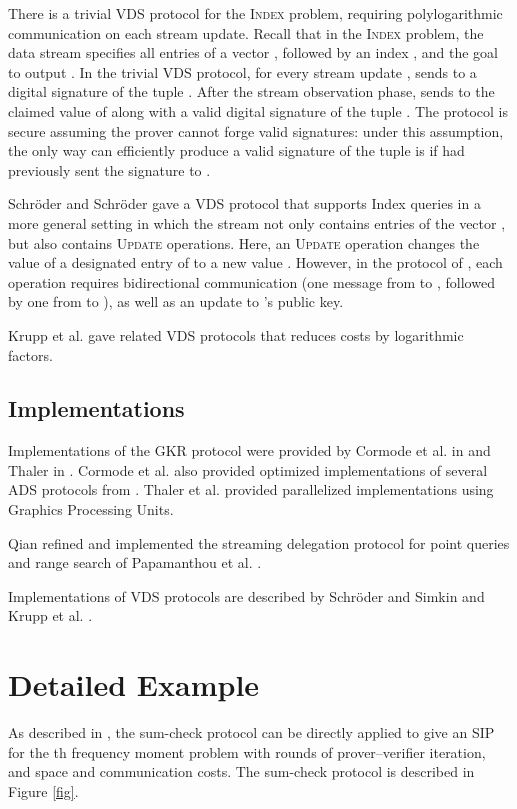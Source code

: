 \documentclass[11pt, letterpaper]{article}
\begin{document}
There is a trivial VDS protocol for the \textsc{Index} problem, requiring polylogarithmic communication on each stream update. Recall that in the \textsc{Index} problem, the data stream specifies all entries of a vector , followed by an index , and the goal to output . In the trivial VDS protocol, for every stream update ,  sends to  a digital signature of the tuple . After the stream observation phase,  sends to  the claimed value of  along with a valid digital signature of the tuple . The protocol is secure assuming the prover cannot forge valid signatures: under this assumption, the only way  can efficiently produce a valid signature of the tuple  is if  had previously sent the signature to .

Schr{\"o}der and Schr{\"o}der \cite{ccs} gave a VDS protocol that supports {\sc Index} queries in a more general setting in which the stream not only contains entries of the vector , but also contains \textsc{Update} operations. Here, an \textsc{Update} operation changes the value of a designated entry  of  to a new value . However, in the protocol of \cite{ccs}, each  operation requires bidirectional communication (one message from  to , followed by one from  to ), as well as an update to 's public key. 

Krupp et al. \cite{krupp} gave related VDS protocols that reduces costs by logarithmic factors.


\subsection{Implementations}
Implementations of the GKR protocol were provided by Cormode et al. in \cite{itcs} and Thaler in \cite{crypto}. Cormode et al. \cite{itcs} also provided 
optimized implementations of several ADS protocols from \cite{icalp, esa}. Thaler et al. \cite{hotcloud} provided parallelized implementations using Graphics Processing Units. 

Qian \cite{sadimp} refined and implemented the streaming delegation protocol for point queries and range search of Papamanthou et al. \cite{eurocryptpaper}.

Implementations of VDS protocols are described by Schr{\"o}der and Simkin \cite{fc} and Krupp et al.  \cite{krupp}.


\section{Detailed Example}
As described in \cite{vldb}, the sum-check protocol can be directly applied to give an SIP for the th frequency moment problem with  rounds of prover--verifier iteration,
and  space and communication costs.
The sum-check protocol is described in Figure \ref{fig}.
\end{document}
